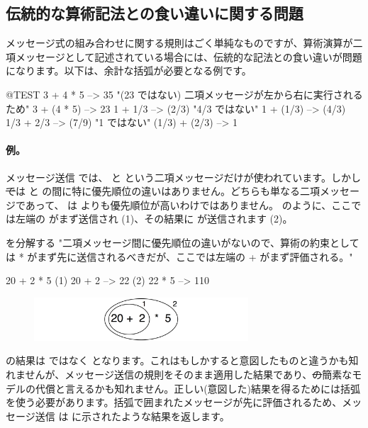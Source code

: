 \documentclass[a4paper,10pt,twoside]{book}
\begin{document}
\subsection{伝統的な算術記法との食い違いに関する問題}
メッセージ式の組み合わせに関する規則はごく単純なものですが、算術演算が二項メッセージとして記述されている場合には、伝統的な記法との食い違いが問題になります。以下は、余計な括弧が必要となる例です。

\begin{code}{@TEST}
3 + 4 * 5      --> 35    "(23 ではない)  二項メッセージが左から右に実行されるため"
3 + (4 * 5)    --> 23
1 + 1/3         --> (2/3)    "4/3 ではない"
1 + (1/3)       --> (4/3)
1/3 + 2/3       --> (7/9)    "1 ではない"
(1/3) + (2/3)  --> 1
\end{code}

\paragraph{例。}
メッセージ送信  では、\ct{+} と \ct{*} という二項メッセージだけが使われています。しかし \st では \ct{+} と \ct{*} の間に特に優先順位の違いはありません。どちらも単なる二項メッセージであって、\ct{*} は \ct{+} よりも優先順位が高いわけではありません。 のように、ここでは左端の \ct{+} がまず送信され (1)、その結果に \ct{*} が送信されます (2)。

\begin{example}[binaryMessages1]{ を分解する}{}
"二項メッセージ間に優先順位の違いがないので、算術の約束としては * がまず先に送信されるべきだが、ここでは左端の + がまず評価される。"

      20 + 2 * 5 
(1)  20 + 2 --> 22
(2)  22       * 5 --> 110
\end{example}

\begin{figure}
\begin{center}\includegraphics[width=8cm]{ucompoNoBracketPar}\end{center}
\end{figure}
\noindent
{}の結果は  ではなく  となります。これはもしかすると意図したものと違うかも知れませんが、メッセージ送信の規則をそのまま適用した結果であり、\st の簡素なモデルの代償と言えるかも知れません。正しい(意図した)結果を得るためには括弧を使う必要があります。括弧で囲まれたメッセージが先に評価されるため、メッセージ送信  は  に示されたような結果を返します。
\end{document}

